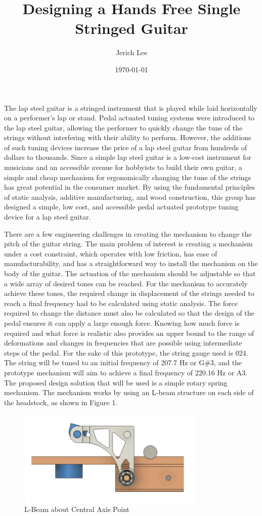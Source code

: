 \documentclass[12pt]{article}
\title{Designing a Hands Free Single Stringed Guitar}
\author{Jerich Lee}
\date{\today}
\theoremstyle{definition} %
\theoremstyle{plain} %
\begin{document}
\maketitle
The lap steel guitar is a stringed instrument that is played while laid horizontally on a
performer’s lap or stand. Pedal actuated tuning systems were introduced to the lap steel guitar,
allowing the performer to quickly change the tune of the strings without interfering with their ability
to perform. However, the additions of such tuning devices increase the price of a lap steel guitar
from hundreds of dollars to thousands. Since a simple lap steel guitar is a low-cost instrument for
musicians and an accessible avenue for hobbyists to build their own guitar, a simple and cheap
mechanism for ergonomically changing the tune of the strings has great potential in the consumer
market. By using the fundamental principles of static analysis, additive manufacturing, and wood
construction, this group has designed a simple, low cost, and accessible pedal actuated prototype
tuning device for a lap steel guitar.

There are a few engineering challenges in creating the mechanism to change the pitch of the
guitar string. The main problem of interest is creating a mechanism under a cost constraint, which
operates with low friction, has ease of manufacturability, and has a straightforward way to install the
mechanism on the body of the guitar. The actuation of the mechanism should be adjustable so that a
wide array of desired tones can be reached. For the mechanism to accurately achieve these tones, the
required change in displacement of the strings needed to reach a final frequency had to be calculated
using static analysis. The force required to change the distance must also be calculated so that the
design of the pedal ensures it can apply a large enough force. Knowing how much force is required
and what force is realistic also provides an upper bound to the range of deformations and changes in
frequencies that are possible using intermediate steps of the pedal. For the sake of this prototype,
the string gauge used is 024. The string will be tuned to an initial frequency of 207.7 Hz or G\#3, and
the prototype mechanism will aim to achieve a final frequency of 220.16 Hz or A3.
The proposed design solution that will be used is a simple rotary spring mechanism. The
mechanism works by using an L-beam structure on each side of the headstock, as shown in Figure 1.

\begin{figure}[htbp]
  \centering
  \includegraphics[width=0.8\textwidth]{fgs/fig1.png}
  \caption{L-Beam about Central Axis Point}
  \label{fig:}
\end{figure}
\end{document}
